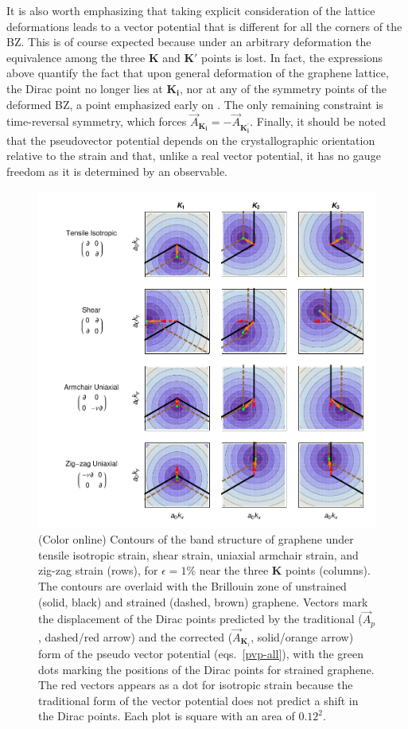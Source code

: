 It is also worth emphasizing that taking explicit consideration of the lattice deformations leads to a vector potential that is different for all the corners of the BZ.
This is of course expected because under an arbitrary deformation the equivalence among the three $\bm{K}$ and $\bm{K'}$ points is lost.
In fact, the expressions above quantify the fact that upon general deformation of the graphene lattice, the Dirac point no longer lies at $\bm{K_i}$, nor at any of the symmetry points of the deformed BZ, a point emphasized early on \cite{Pereira2009}.
The only remaining constraint is time-reversal symmetry, which forces $\vec{A}_{\bm{K_i}} = - \vec{A}_{\bm{K_i^\prime}}$.
Finally, it should be noted that the pseudovector potential depends on the crystallographic orientation relative to the strain and that, unlike a real vector potential, it has no gauge freedom as it is determined by an observable.

\begin{figure}
\includegraphics{Figs_PVP/figure_2.pdf}
\caption{(Color online) Contours of the band structure of graphene under tensile isotropic strain, shear strain, uniaxial armchair strain, and zig-zag strain (rows), for $\epsilon=1\%$ near the three $\bm{K}$ points (columns). The contours are overlaid with the Brillouin zone of unstrained (solid, black)  and strained (dashed, brown) graphene. Vectors mark the displacement of the Dirac points predicted by the traditional ($\vec{A}_p$, dashed/red arrow) and the corrected ($\vec{A}_{\bm{K}_{\!i}}$, solid/orange arrow) form of the pseudo vector potential (eqs.~\ref{pvp-all}), with the green dots marking the positions of the Dirac points for strained graphene. The red vectors appears as a dot for isotropic strain because the traditional form of the vector potential does not predict a shift in the Dirac points.  Each plot is square with an area of $0.12^2$. \label{PVPshifts}}
\end{figure}


